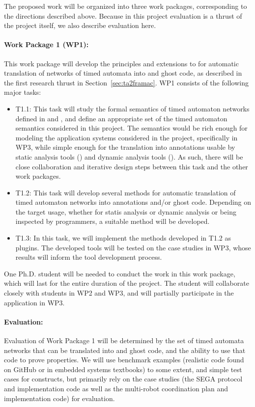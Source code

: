 The proposed work will be organized into three work packages,
corresponding to the directions described above.  Because in this
project evaluation is a thrust of the project itself,
we also describe evaluation here.

\paragraph{Work Package 1 (WP1):} This work package will develop the principles and extensions to \framac for automatic translation of networks of timed automata into \acsl and ghost code, as described in the first research thrust in Section~\ref{sec:ta2framac}.
WP1 consists of the following major tasks:
\begin{itemize}[labelsep=3pt,leftmargin=12pt]

\item T1.1: This task will study the formal semantics of timed automaton networks defined in \uppaal and \prism, and define an appropriate set of the timed automaton semantics considered in this project.  The semantics would be rich enough for modeling the application systems considered in the project, specifically in WP3, while simple enough for the translation into annotations usable by static analysis tools (\framac) and dynamic analysis tools (\deepstate).  As such, there will be close collaboration and iterative design steps between this task and the other work packages. %

\item T1.2: This task will develop several methods for automatic translation of timed automaton networks into \acsl annotations and/or ghost code.  Depending on the target usage, whether for statis analysis or dynamic analysis or being inspected by programmers, a suitable method will be developed.

\item T1.3: In this task, we will implement the methods developed in T1.2 as \framac plugins.  The developed tools will be tested on the case studies %
  in WP3, whose results will inform the tool development process.
\end{itemize}

One Ph.D. student will be needed to conduct the work in this work package, which will last for the entire duration of the project.
The student will collaborate closely with students in WP2 and WP3, and
will partially participate in the application in WP3.

\paragraph{Evaluation:} Evaluation of
Work Package 1 will be determined by the set of timed automata
networks that can be translated into \acsl and ghost code, and the
ability to use that code to prove properties.  We will use benchmark
examples (realistic code found on GitHub or in embedded systems
textbooks) to some extent, and simple test cases for constructs, but
primarily rely on the case studies (the SEGA protocol and
implementation code as well as the multi-robot coordination plan and
implementation code) for evaluation.


